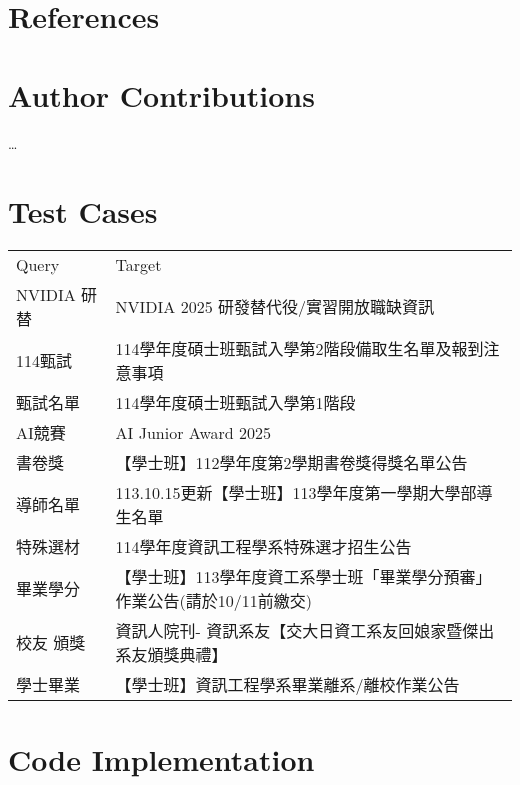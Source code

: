 \section{References}

\appendix
\section{Author Contributions}
\dots



\section{Test Cases}

\begin{table}[H]
    \begin{tabular}{ll}
    \hline
    Query     & Target                                    \\
    NVIDIA 研替 & NVIDIA 2025 研發替代役/實習開放職缺資訊                \\
    114甄試     & 114學年度碩士班甄試入學第2階段備取生名單及報到注意事項             \\
    甄試名單      & 114學年度碩士班甄試入學第1階段                         \\
    AI競賽      & AI Junior Award 2025                      \\
    書卷獎       & 【學士班】112學年度第2學期書卷獎得獎名單公告                  \\
    導師名單      & 113.10.15更新【學士班】113學年度第一學期大學部導生名單         \\
    特殊選材      & 114學年度資訊工程學系特殊選才招生公告                      \\
    畢業學分      & 【學士班】113學年度資工系學士班「畢業學分預審」作業公告(請於10/11前繳交) \\
    校友 頒獎     & 資訊人院刊- 資訊系友【交大日資工系友回娘家暨傑出系友頒獎典禮】          \\
    學士畢業      & 【學士班】資訊工程學系畢業離系/離校作業公告                   
    \end{tabular}
\end{table}

\section{Code Implementation}

